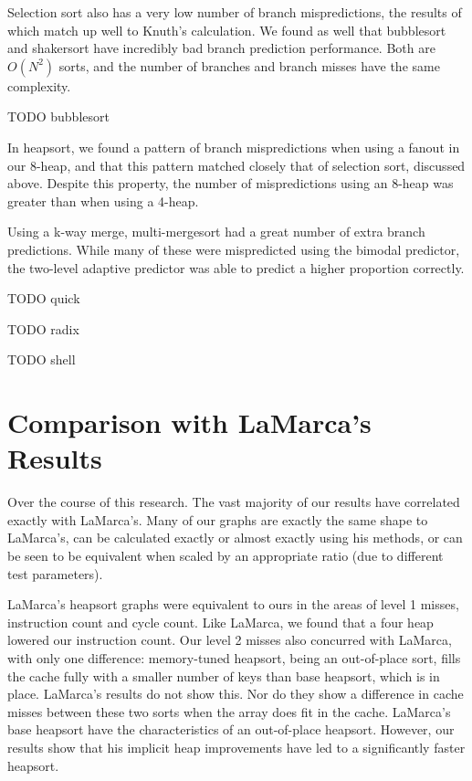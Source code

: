 Selection sort also has a very low number of branch mispredictions, the results
of which match up well to Knuth's calculation. We found as well that bubblesort
and shakersort have incredibly bad branch prediction performance. Both are
$O(N^2)$ sorts, and the number of branches and branch misses have the same
complexity.

TODO bubblesort

In heapsort, we found a pattern of branch mispredictions when using a fanout in
our 8-heap, and that this pattern matched closely that of selection sort,
discussed above. Despite this property, the number of mispredictions using an
8-heap was greater than when using a 4-heap.

Using a k-way merge, multi-mergesort had a great number of extra branch
predictions. While many of these were mispredicted using the bimodal predictor,
the two-level adaptive predictor was able to predict a higher
proportion correctly.


TODO quick

TODO radix

TODO shell



\section{Comparison with LaMarca's Results}

Over the course of this research. The vast majority of our results have
correlated exactly with LaMarca's. Many of our graphs are exactly the same
shape to LaMarca's, can be calculated exactly or almost exactly using his
methods, or can be seen to be equivalent when scaled by an appropriate ratio
(due to different test parameters).

LaMarca's heapsort graphs were equivalent to ours in the areas of level 1
misses, instruction count and cycle count. Like LaMarca, we found that a four
heap lowered our instruction count. Our level 2 misses also concurred with
LaMarca, with only one difference: memory-tuned heapsort, being an out-of-place sort,
fills the cache fully with a smaller number of keys than base heapsort, which is
in place. LaMarca's results do not show this. Nor do they show a difference in
cache misses between these two sorts when the array does fit in the cache.
LaMarca's base heapsort have the characteristics of an out-of-place heapsort.
However, our results show that his implicit heap improvements have led to a
significantly faster heapsort.

